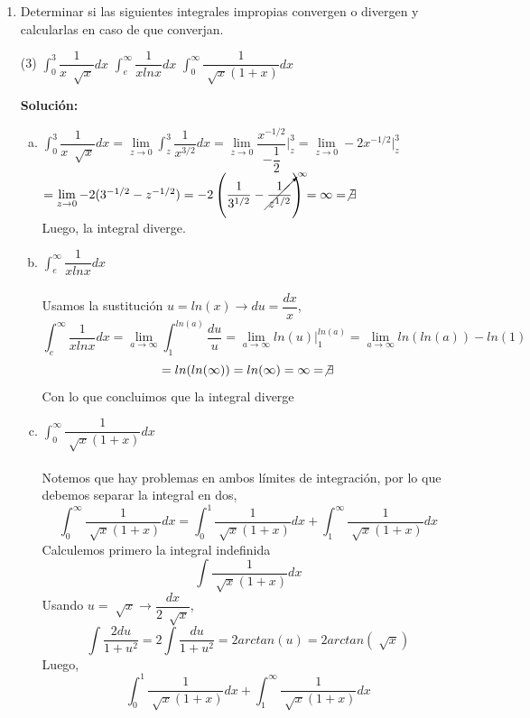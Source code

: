 \documentclass[12pt]{article}
\newenvironment{solucion}
{\begin{mdframed}[backgroundcolor=black!10]
		{\bf Solución:}\\
	}
	{
	\end{mdframed}
}
\newenvironment{preguntas}
{\begin{enumerate}\itemsep12pt
	}
	{
	\end{enumerate}
}
\newcommand{\ev}{\Big|}
\newcommand{\ra}{\rightarrow}
\begin{document}
\begin{preguntas}
\item Determinar si las siguientes integrales impropias convergen o divergen y calcularlas en caso de que converjan.
\begin{tasks}(3)
\task $\displaystyle\int_{0}^{3}\dfrac{1}{x\ \sqrt[]{x}}dx$
\task $\displaystyle\int_{e}^{\infty}\dfrac{1}{xlnx}dx$
\task $\displaystyle\int_{0}^{\infty}\dfrac{1}{\sqrt[]{x}(1+x)}dx$
\end{tasks}
\begin{solucion}

\begin{enumerate}[a)]
\item $\displaystyle\int_{0}^{3}\dfrac{1}{x\ \sqrt[]{x}}dx
			= \lim\limits_{z\ra 0} \displaystyle\int_{z}^{3}\dfrac{1}{x^{3/2}}dx 
			= \lim\limits_{z\ra 0} \dfrac{x^{-1/2}}{-\dfrac{1}{2}}\ev_z^3 
			= \lim\limits_{z\ra 0} -2x^{-1/2} \ev_z^3$\\
			$= \lim\limits_{z\ra 0} -2(3^{-1/2}-z^{-1/2})
			 = -2\left(\dfrac{1}{3^{1/2}} - \cancelto{\infty}{\dfrac{1}{z^{1/2}}}\right) = \infty = \not \exists$\\
			Luego, la integral diverge.
\item $\displaystyle\int_{e}^{\infty}\dfrac{1}{xlnx}dx$\\
			\\
			Usamos la sustitución $u=ln(x) \ra du = \dfrac{dx}{x}$,
			$$\displaystyle\int_{e}^{\infty}\dfrac{1}{xlnx}dx
			= \lim\limits_{a\ra \infty} \int_1^{ln(a)} \dfrac{du}{u}
			= \lim\limits_{a\ra \infty} ln(u) \ev_1^{ln(a)}
			= \lim\limits_{a\ra \infty} ln(ln(a)) - ln(1)$$
			$$= ln(ln(\infty)) = ln(\infty) = \infty = \not \exists$$
			Con lo que concluimos que la integral diverge
\item $\displaystyle\int_{0}^{\infty}\dfrac{1}{\sqrt[]{x}(1+x)}dx$\\
			\\
			Notemos que hay problemas en ambos límites de integración, por lo que debemos separar la integral en dos,
			$$\displaystyle\int_{0}^{\infty}\dfrac{1}{\sqrt[]{x}(1+x)}dx = \displaystyle\int_{0}^{1}\dfrac{1}{\sqrt[]{x}(1+x)}dx + \displaystyle\int_{1}^{\infty}\dfrac{1}{\sqrt[]{x}(1+x)}dx$$
			Calculemos primero la integral indefinida
			$$\displaystyle\int \dfrac{1}{\sqrt[]{x}(1+x)}dx$$
			Usando $u = \sqrt[]{x} \ra \dfrac{dx}{2\ \sqrt[]{x}}$,
			$$\int \dfrac{2du}{1+u^2} = 2\int \dfrac{du}{1+u^2} = 2arctan(u) = 2arctan(\sqrt[]{x})$$
			Luego,
			$$\displaystyle\int_{0}^{1}\dfrac{1}{\sqrt[]{x}(1+x)}dx + \displaystyle\int_{1}^{\infty}\dfrac{1}{\sqrt[]{x}(1+x)}dx$$

\end{enumerate}
\end{solucion}
\end{preguntas}
\end{document}
